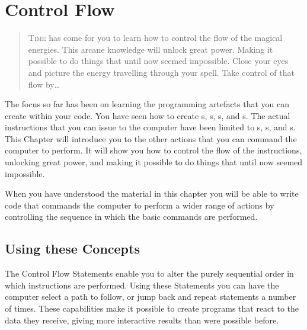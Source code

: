 \chapter{Control Flow} %
\label{cha:control_flow}

\begin{quote}
  \Fontlukas\Large
  \renewcommand{\LettrineTextFont}{\relax}
  \lettrine[image=true,lines=3,lraise=0.1]
  {T}{ime} has come for you to learn how to control the flow of the magical energies. This arcane knowledge will unlock great power. Making it possible to do things that until now seemed impossible. Close your eyes and picture the energy travelling through your spell. Take control of that flow by\ldots
\end{quote}

\bigskip


The focus so far has been on learning the programming artefacts that you can create within your code. You have seen how to create s, s, s, and s. The actual instructions that you can issue to the computer have been limited to s, s, and s. This Chapter will introduce you to the other actions that you can command the computer to perform. It will show you how to control the flow of the instructions, unlocking great power, and making it possible to do things that until now seemed impossible.

When you have understood the material in this chapter you will be able to write code that commands the computer to perform a wider range of actions by controlling the sequence in which the basic commands are performed.

\minitoc



\clearpage
\section{Using these Concepts} %
\label{sec:control_flow_using_these_concepts}

The Control Flow Statements enable you to alter the purely sequential order in which instructions are performed. Using these Statements you can have the computer select a path to follow, or jump back and repeat statements a number of times. These capabilities make it possible to create programs that react to the data they receive, giving more interactive results than were possible before.

